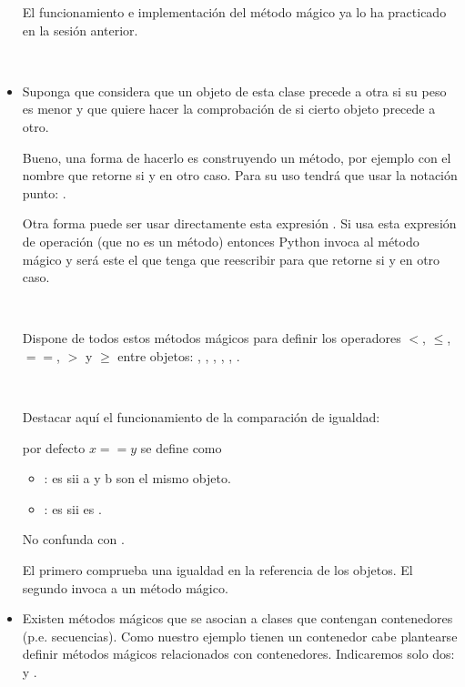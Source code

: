 \begin{itemize}
\begin{note}
El funcionamiento e implementación del método mágico  ya lo ha practicado en la sesión anterior.
\end{note}

\

\item Suponga que considera que un objeto de esta clase precede a otra si su peso es menor y que quiere hacer la comprobación de si cierto objeto precede a otro.

Bueno, una forma de hacerlo es construyendo un método, por ejemplo con el nombre  que retorne  si  y  en otro caso. Para su uso tendrá que usar la notación punto:  .


Otra forma puede ser usar directamente esta expresión .  Si usa esta expresión de operación (que no es un método) entonces Python invoca al método mágico  y será este el que tenga que reescribir para que retorne   si  y  en otro caso.  

\


Dispone de todos estos métodos mágicos para definir los operadores  $<$, $\leq$, $==$, $>$ y $\geq$ entre objetos:
 ,
,
,
,
,
. 	

\

Destacar aquí el funcionamiento de la comparación de igualdad: 

\centerline{por defecto $x==y$ se define como }

\begin{itemize}
\item {} : es  sii a y b son el mismo objeto.
\item \cmbox{==} : es  sii  es .
\end{itemize}

\centerline{No confunda  con \cmbox{==}.}


El primero comprueba una igualdad en la referencia de los objetos. El segundo invoca a un método mágico.


\item Existen métodos mágicos que se asocian a clases que contengan contenedores (p.e. secuencias). 
Como nuestro ejemplo tienen un contenedor cabe plantearse definir  métodos mágicos relacionados con contenedores. Indicaremos solo dos: y .



\end{itemize}
